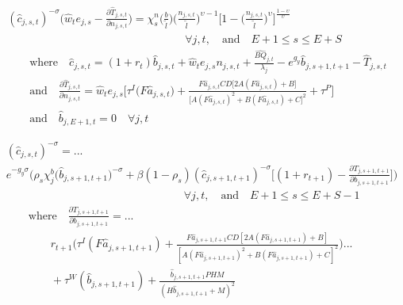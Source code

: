 \documentclass[letterpaper,12pt]{article}
\theoremstyle{definition}
\begin{document}
\begin{spacing}{1.5}
    \begin{equation}\label{EqEulerLabStat}
      \begin{split}
        &(\hat{c}_{j,s,t})^{-\sigma}\Biggl(\hat{w}_t e_{j,s} - \frac{\partial\hat{T}_{j,s,t}}{\partial n_{j,s,t}}\Biggr) = \chi^n_{s}\biggl(\frac{b}{\tilde{l}}\biggr)\biggl(\frac{n_{j,s,t}}{\tilde{l}}\biggr)^{\upsilon-1}\Biggl[1 - \biggl(\frac{n_{j,s,t}}{\tilde{l}}\biggr)^\upsilon\Biggr]^{\frac{1-\upsilon}{\upsilon}} \\
        &\qquad\qquad\qquad\qquad\qquad\qquad\qquad\qquad\forall j,t, \quad\text{and}\quad E+1\leq s\leq E+S \\
        &\qquad\text{where}\quad \hat{c}_{j,s,t} = \left(1 + r_t\right)\hat{b}_{j,s,t} + \hat{w}_t e_{j,s}n_{j,s,t} + \frac{\hat{BQ}_{j,t}}{\lambda_j} - e^{g_y}\hat{b}_{j,s+1,t+1} - \hat{T}_{j,s,t} \\
        &\qquad\text{and}\quad \frac{\partial \hat{T}_{j,s,t}}{\partial n_{j,s,t}} = \hat{w}_t e_{j,s}\biggl[\tau^I\bigl(F\hat{a}_{j,s,t}\bigr) + \frac{F\hat{a}_{j,s,t}CD\bigl[2A(F\hat{a}_{j,s,t})+B\bigr]}{\bigl[A(F\hat{a}_{j,s,t})^2+B(F \hat{a}_{j,s,t})+C\bigr]^2} + \tau^P\Biggr] \\
        &\qquad\text{and}\quad \hat{b}_{j,E+1,t} = 0 \quad\forall j,t
      \end{split}
    \end{equation}

    \begin{equation}\label{EqEulerSavStat}
      \begin{split}
        &(\hat{c}_{j,s,t})^{-\sigma} = ... \\
        &e^{-g_y\sigma}\Biggl(\rho_s\chi^b_j \bigl(\hat{b}_{j,s+1,t+1}\bigr)^{-\sigma} + \beta(1-\rho_s)(\hat{c}_{j,s+1,t+1})^{-\sigma}\Biggl[(1 + r_{t+1}) - \frac{\partial T_{j,s+1,t+1}}{\partial b_{j,s+1,t+1}}\Biggr]\Biggr) \\
        &\qquad\qquad\qquad\qquad\qquad\qquad\qquad\qquad\forall j,t,\quad\text{and}\quad E+1\leq s \leq E+S-1 \\
        &\qquad\text{where}\quad \frac{\partial T_{j,s+1,t+1}}{\partial b_{j,s+1,t+1}} = ...\\
        &\qquad\qquad r_{t+1}\Biggl(\tau^I(F\hat{a}_{j,s+1,t+1}) + \frac{F\hat{a}_{j,s+1,t+1}CD\left[2A(F\hat{a}_{j,s+1,t+1}) + B\right]}{\left[A(F\hat{a}_{j,s+1,t+1})^2 + B(F\hat{a}_{j,s+1,t+1}) + C\right]^2}\Biggr) ... \\
        &\qquad\qquad + \tau^W(\hat{b}_{j,s+1,t+1}) + \frac{\hat{b}_{j,s+1,t+1}PHM}{\left(H\hat{b}_{j,s+1,t+1} + M\right)^2}
      \end{split}
    \end{equation}


\end{spacing}
\end{document}
